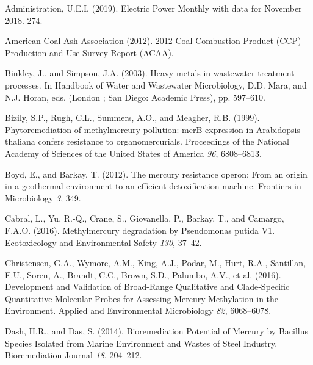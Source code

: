 \documentclass[ms]{uncgdissertationexp}
\theoremstyle{plain}
\theoremstyle{definition}
\theoremstyle{remark}
\begin{document}
  \hypertarget{refs}{}
  \hypertarget{ref-usenergyinformationadministrationElectricPowerMonthly2019}{}
  Administration, U.E.I. (2019). Electric Power Monthly with data for
  November 2018. 274.
  
  \hypertarget{ref-americancoalashassociation2012CoalCombustion2012}{}
  American Coal Ash Association (2012). 2012 Coal Combustion Product (CCP)
  Production and Use Survey Report (ACAA).
  
  \hypertarget{ref-binkleyHeavyMetalsWastewater2003}{}
  Binkley, J., and Simpson, J.A. (2003). Heavy metals in wastewater
  treatment processes. In Handbook of Water and Wastewater Microbiology,
  D.D. Mara, and N.J. Horan, eds. (London ; San Diego: Academic Press),
  pp. 597--610.
  
  \hypertarget{ref-bizilyPhytoremediationMethylmercuryPollution1999}{}
  Bizily, S.P., Rugh, C.L., Summers, A.O., and Meagher, R.B. (1999).
  Phytoremediation of methylmercury pollution: merB expression in
  Arabidopsis thaliana confers resistance to organomercurials. Proceedings
  of the National Academy of Sciences of the United States of America
  \emph{96}, 6808--6813.
  
  \hypertarget{ref-boydMercuryResistanceOperon2012}{}
  Boyd, E., and Barkay, T. (2012). The mercury resistance operon: From an
  origin in a geothermal environment to an efficient detoxification
  machine. Frontiers in Microbiology \emph{3}, 349.
  
  \hypertarget{ref-cabralMethylmercuryDegradationPseudomonas2016}{}
  Cabral, L., Yu, R.-Q., Crane, S., Giovanella, P., Barkay, T., and
  Camargo, F.A.O. (2016). Methylmercury degradation by Pseudomonas putida
  V1. Ecotoxicology and Environmental Safety \emph{130}, 37--42.
  
  \hypertarget{ref-christensenDevelopmentValidationBroadRange2016}{}
  Christensen, G.A., Wymore, A.M., King, A.J., Podar, M., Hurt, R.A.,
  Santillan, E.U., Soren, A., Brandt, C.C., Brown, S.D., Palumbo, A.V., et
  al. (2016). Development and Validation of Broad-Range Qualitative and
  Clade-Specific Quantitative Molecular Probes for Assessing Mercury
  Methylation in the Environment. Applied and Environmental Microbiology
  \emph{82}, 6068--6078.
  
  \hypertarget{ref-dashBioremediationPotentialMercury2014}{}
  Dash, H.R., and Das, S. (2014). Bioremediation Potential of Mercury by
  Bacillus Species Isolated from Marine Environment and Wastes of Steel
  Industry. Bioremediation Journal \emph{18}, 204--212.
  
\end{document}
